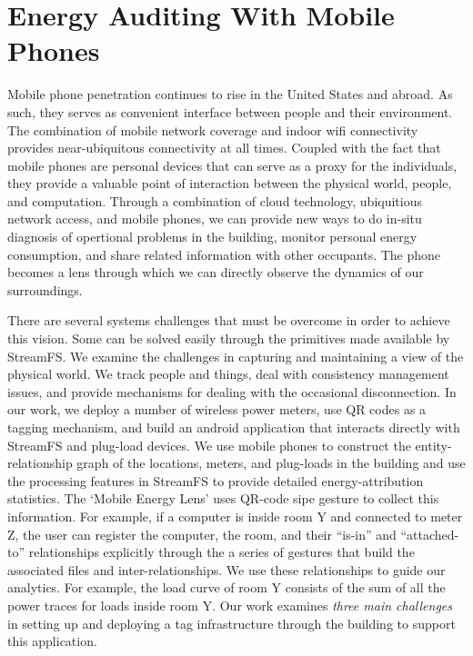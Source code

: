 \section{Energy Auditing With Mobile Phones} 
\label{sec:mobileaudit}

Mobile phone penetration continues to rise in the United States and abroad.
As such, they serves as convenient interface between people and their environment.  
The combination of mobile network coverage and indoor wifi connectivity provides near-ubiquitous
connectivity at all times.  Coupled with the fact that mobile phones are personal devices that can serve as a proxy 
for the individuals, they provide a valuable point of interaction between the physical world, people, and
computation.  Through a combination of cloud technology, ubiquitious network access, and mobile phones, 
we can provide new ways to do in-situ diagnosis of opertional problems in the building, monitor personal energy consumption, 
and share related information with other occupants.  The phone becomes a lens through which we can directly observe the dynamics 
of our surroundings.

There are several systems challenges that must be overcome in order to achieve this vision.  Some can be solved easily 
through the primitives made available by StreamFS.  
We examine the challenges in capturing and maintaining a view of the physical world.  We track people and things,
deal with consistency management issues, and provide mechanisms for dealing with the occasional disconnection.
In our work, we deploy a number of
wireless power meters, use QR codes as a tagging mechanism, and build an android application that interacts directly with
StreamFS and plug-load devices.
We use mobile phones to construct the entity-relationship 
graph of the locations, meters, and plug-loads in the building and use the processing features in StreamFS to provide detailed energy-attribution
statistics.  The `Mobile Energy Lens' uses QR-code sipe gesture to collect this information.  For example, if a computer is inside 
room Y and connected to meter Z, the user can register the computer, the room, and their ``is-in'' and ``attached-to'' relationships
explicitly through the a series of gestures that build the associated files and inter-relationships.  
We use these relationships to guide our analytics.
For example, the load curve of room Y consists of the sum of all the power traces for loads
inside room Y.  Our work examines \emph{three main challenges} in setting up and deploying a tag infrastructure through the building to 
support this application.




